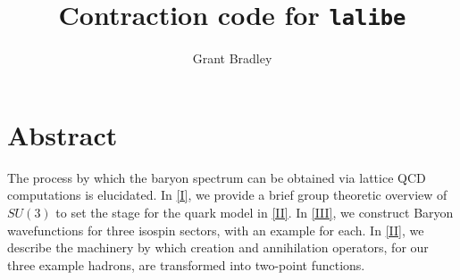 \documentclass[prd,12pt,superscriptaddress,tightenlines,nofootinbib]{revtex4}
\theoremstyle{plain}
\theoremstyle{definition}
\theoremstyle{remark}
\begin{document}
\title{Contraction code for \texttt{lalibe}}

\author{Grant Bradley}


\maketitle

\section{Abstract}
The process by which the baryon spectrum can be obtained via lattice QCD computations is
elucidated. In \ref{I}, we provide a brief group theoretic overview of $SU(3)$ to set the stage for the quark model 
in \ref{II}. In \ref{III}, we construct Baryon wavefunctions for three isospin sectors,
with an example for each. In \ref{II}, we describe the machinery by which creation and annihilation 
operators, for our three example hadrons, are transformed into two-point functions.  
\end{document}
